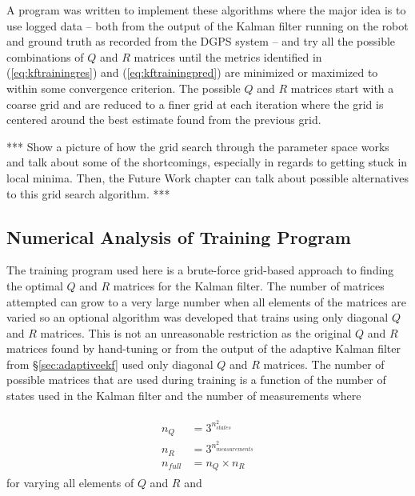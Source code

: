A program was written to implement these algorithms where the major idea is to use logged data -- both from the output of the Kalman filter running on the robot and ground truth as recorded from the DGPS system -- and try all the possible combinations of $Q$ and $R$ matrices until the metrics identified in (\ref{eq:kftrainingres}) and (\ref{eq:kftrainingpred}) are minimized or maximized to within some convergence criterion. The possible $Q$ and $R$ matrices start with a coarse grid and are reduced to a finer grid at each iteration where the grid is centered around the best estimate found from the previous grid.

*** Show a picture of how the grid search through the parameter space works and talk about some of the shortcomings, especially in regards to getting stuck in local minima. Then, the Future Work chapter can talk about possible alternatives to this grid search algorithm. ***


\subsection{Numerical Analysis of Training Program}
\label{sec:trainingNumericalAnalysis}
The training program used here is a brute-force grid-based approach to finding the optimal $Q$ and $R$ matrices for the Kalman filter. The number of matrices attempted can grow to a very large number when all elements of the matrices are varied so an optional algorithm was developed that trains using only diagonal $Q$ and $R$ matrices. This is not an unreasonable restriction as the original $Q$ and $R$ matrices found by hand-tuning or from the output of the adaptive Kalman filter from \S\ref{sec:adaptiveekf} used only diagonal $Q$ and $R$ matrices. The number of possible matrices that are used during training is a function of the number of states used in the Kalman filter and the number of measurements where

\begin{align*}
\begin{split}
n_Q &= 3^{n_{states}^2} \\
n_R &= 3^{n_{measurements}^2} \\
n_{full} &= n_Q \times n_R
\end{split}
\end{align*}
for varying all elements of $Q$ and $R$ and

